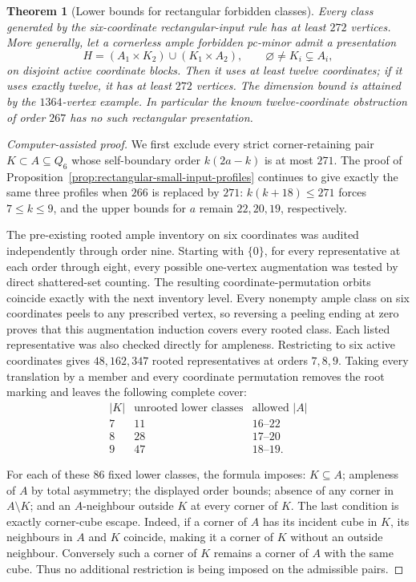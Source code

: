 \documentclass[11pt]{article}
\numberwithin{equation}{section}
\newtheorem{theorem}{Theorem}[section]
\theoremstyle{definition}
\theoremstyle{remark}
\begin{document}
\begin{theorem}[Lower bounds for rectangular forbidden classes]
\label{thm:rectangular-input-order-exclusion}
Every class generated by the six-coordinate rectangular-input rule
has at least $272$ vertices. More generally, let a cornerless ample
forbidden pc-minor admit a presentation
\[
 H=(A_1\times K_2)\cup(K_1\times A_2),\qquad
 \varnothing\ne K_i\subsetneq A_i,
\]
on disjoint active coordinate blocks. Then it uses at least twelve
coordinates; if it uses exactly twelve, it has at least $272$ vertices.
The dimension bound is attained by the $1364$-vertex example.
In particular the known twelve-coordinate obstruction of order $267$
has no such rectangular presentation.
\end{theorem}
\begin{proof}[Computer-assisted proof]
We first exclude every strict corner-retaining pair $K\subset A\subseteq Q_6$
whose self-boundary order $k(2a-k)$ is at most $271$.
The proof of Proposition~\ref{prop:rectangular-small-input-profiles}
continues to give exactly the same three profiles when $266$ is
replaced by $271$: $k(k+18)\le271$ forces $7\le k\le9$, and the
upper bounds for $a$ remain $22,20,19$, respectively.

The pre-existing rooted ample inventory on six coordinates was audited
independently through order nine. Starting with $\{0\}$, for every
representative at each order through eight, every possible one-vertex
augmentation was tested by direct shattered-set counting. The resulting
coordinate-permutation orbits coincide exactly with the next inventory
level. Every nonempty ample class on six coordinates peels to any
prescribed vertex, so reversing a peeling ending at zero proves that
this augmentation induction covers every rooted class. Each listed
representative was also checked directly for ampleness. Restricting
to six active coordinates gives $48,162,347$ rooted representatives
at orders $7,8,9$. Taking every translation by a member and every
coordinate permutation removes the root marking and leaves the
following complete cover:
\[
\begin{array}{c|c|c}
 |K|&\text{unrooted lower classes}&\text{allowed }|A|\\\hline
 7&11&16\text{--}22\\
 8&28&17\text{--}20\\
 9&47&18\text{--}19.
\end{array}
\]

For each of these $86$ fixed lower classes, the formula imposes:
$K\subseteq A$; ampleness of $A$ by total asymmetry; the displayed
order bounds; absence of any corner in $A\setminus K$; and an
$A$-neighbour outside $K$ at every corner of $K$. The last condition
is exactly corner-cube escape. Indeed, if a corner of $A$ has its
incident cube in $K$, its neighbours in $A$ and $K$ coincide, making
it a corner of $K$ without an outside neighbour. Conversely such a
corner of $K$ remains a corner of $A$ with the same cube. Thus no
additional restriction is being imposed on the admissible pairs.


\end{proof}
\end{document}

